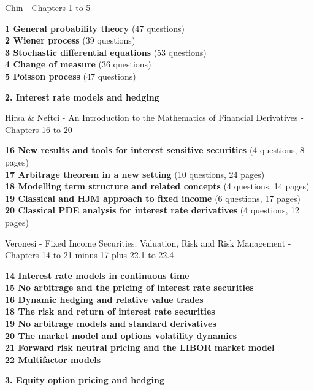 \documentclass[hidelinks, 12pt]{article}
\theoremstyle{mydefstyle}
\theoremstyle{mythmstyle}
\begin{document}
Chin - Chapters 1 to 5

\textbf{1 General probability theory} (47 questions) \\
\textbf{2 Wiener process} (39 questions) \\
\textbf{3 Stochastic differential equations} (53 questions) \\
\textbf{4 Change of measure} (36 questions) \\
\textbf{5 Poisson process} (47 questions)

\newpage

\begin{center}
\textbf{2. Interest rate models and hedging}
\end{center}

Hirsa \& Neftci - An Introduction to the Mathematics of Financial Derivatives  - Chapters 16 to 20

\textbf{16 New results and tools for interest sensitive securities} (4 questions, 8 pages) \\
\textbf{17 Arbitrage theorem in a new setting} (10 questions, 24 pages) \\
\textbf{18 Modelling term structure and related concepts} (4 questions, 14 pages) \\
\textbf{19 Classical and HJM approach to fixed income} (6 questions, 17 pages) \\
\textbf{20 Classical PDE analysis for interest rate derivatives} (4 questions, 12 pages)

Veronesi - Fixed Income Securities: Valuation, Risk and Risk Management - Chapters 14 to 21 minus 17 plus 22.1 to 22.4

\textbf{14 Interest rate models in continuous time} \\
\textbf{15 No arbitrage and the pricing of interest rate securities} \\
\textbf{16 Dynamic hedging and relative value trades} \\
\textbf{18 The risk and return of interest rate securities} \\
\textbf{19 No arbitrage models and standard derivatives} \\
\textbf{20 The market model and options volatility dynamics} \\
\textbf{21 Forward risk neutral pricing and the LIBOR market model} \\
\textbf{22 Multifactor models}

\begin{center}
\textbf{3. Equity option pricing and hedging}
\end{center}
\end{document}
